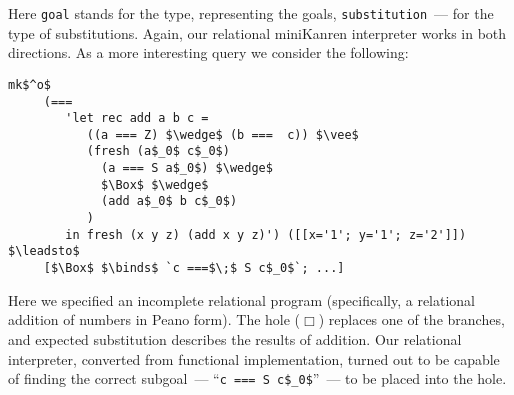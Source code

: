 Here \lstinline|goal| stands for the type, representing the goals, \lstinline|substitution|~--- for the type of substitutions. Again, 
our relational miniKanren interpreter works in both directions. As a more interesting query we consider the following:

\begin{lstlisting}[basicstyle=\small]
   mk$^o$
     (=== 
        'let rec add a b c =
           ((a === Z) $\wedge$ (b ===  c)) $\vee$
           (fresh (a$_0$ c$_0$)
             (a === S a$_0$) $\wedge$
             $\Box$ $\wedge$
             (add a$_0$ b c$_0$)
           )
        in fresh (x y z) (add x y z)') ([[x='1'; y='1'; z='2']])  $\leadsto$   
     [$\Box$ $\binds$ `c ===$\;$ S c$_0$`; ...]
\end{lstlisting}

Here we specified an incomplete relational program (specifically, a relational addition of numbers in Peano form). The hole ($\Box$) replaces
one of the branches, and expected substitution describes the results of addition. Our relational interpreter, converted from functional
implementation, turned out to be capable of finding the correct subgoal~--- ``\lstinline|c === S c$_0$|''~--- to be placed into the hole.


